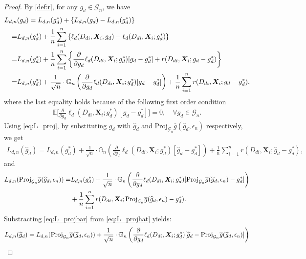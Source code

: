 \documentclass[11pt]{article}
\numberwithin{equation}{section}
\begin{document}
\begin{proof}
	By \eqref{def:r},	for any $g_d\in\mathcal{G}_{n}$, we have
	\begin{align}
		L_{d,n}&(g_d)=L_{d,n}(g^*_d)+\left\{L_{d,n}(g_d)-L_{d,n}(g^*_d)\right\} \notag\\
		=&L_{d,n}(g^*_d)+\frac{1}{n}\sum_{i=1}^n\left\{\ell_d(D_{di},\boldsymbol{X}_{i};g_d)-\ell_d(D_{di},\boldsymbol{X}_{i};g^*_d)\right\} \notag\\
		=&L_{d,n}(g^*_d)+\frac{1}{n}\sum_{i=1}^n\left\{\frac{\partial}{\partial g_d}\ell_d(D_{di},\boldsymbol{X}_{i};g^*_d)[g_d-g^*_d]+r(D_{di},\boldsymbol{X}_{i};g_d-g^*_d)\right\}  \notag\\
		=&L_{d,n}(g^*_d)+\frac{1}{\sqrt{n}}\cdot  \mathbb{G}_n\left(\frac{\partial}{\partial g_d}\ell_d(D_{di},\boldsymbol{X}_{i};g^*_d)[g_d-g^*_d]\right)+\frac{1}{n}\sum_{i=1}^nr(D_{di},\boldsymbol{X}_{i};g_d-g^*_d), \label{eq:L_proj}
	\end{align}
	where the last equality holds because of the following first order condition
	\begin{align*}
		\mathbb{E}\bigg[\frac{\partial}{\partial g_d}\ell_d(D_{di},\boldsymbol{X}_{i};g^*_d)[g_d -g^*_d ]\bigg]=0, \quad \forall g_d\in\mathcal{G}_n.
	\end{align*}
	Using \eqref{eq:L_proj}, by substituting $g_d$ with $\widehat{g}_d$ and $\text{Proj}_{\mathcal{G}_{n}}\overline{g}(\widehat{g}_d,\epsilon_n)$ respectively, we get
	\begin{align}
		L_{d,n}(\widehat{g}_d)=L_{d,n}(g^*_d)+\frac{1}{\sqrt{n}}\cdot  \mathbb{G}_n\left(\frac{\partial}{\partial g_d}\ell_d(D_{di},\boldsymbol{X}_{i};g^*_d)[ \widehat{g}_d-g^*_d]\right)+\frac{1}{n}\sum_{i=1}^nr(D_{di},\boldsymbol{X}_{i};\widehat{g}_d-g^*_d), \label{eq:L_projhat}
	\end{align}
	and
	\begin{align}
		L_{d,n}(\text{Proj}_{\mathcal{G}_{n}}\overline{g}(\widehat{g}_d,\epsilon_n))=&L_{d,n}(g^*_d)+\frac{1}{\sqrt{n}}\cdot  \mathbb{G}_n\left(\frac{\partial}{\partial g_d}\ell_d(D_{di},\boldsymbol{X}_{i};g^*_d)[\text{Proj}_{\mathcal{G}_{n}}\overline{g}(\widehat{g}_d,\epsilon_n)-g^*_d]\right) \notag\\
		&+\frac{1}{n} \sum_{i=1}^nr(D_{di},\boldsymbol{X}_{i};\text{Proj}_{\mathcal{G}_{n}}\overline{g}(\widehat{g}_d,\epsilon_n)-g^*_d). \label{eq:L_projbar}
	\end{align}
	Substracting \eqref{eq:L_projbar} from \eqref{eq:L_projhat} yields:
	\begin{align*}
		&L_{d,n}(\widehat{g}_d)=L_{d,n}(\text{Proj}_{\mathcal{G}_{n}}\overline{g}(\widehat{g}_d,\epsilon_n))+\frac{1}{\sqrt{n}}\cdot  \mathbb{G}_n\left(\frac{\partial}{\partial g_d}\ell_d(D_{di},\boldsymbol{X}_{i};g^*_d)[ \widehat{g}_d-\text{Proj}_{\mathcal{G}_{n}}\overline{g}(\widehat{g}_d,\epsilon_n)]\right) \notag\\

\end{align*}
\end{proof}
\end{document}
